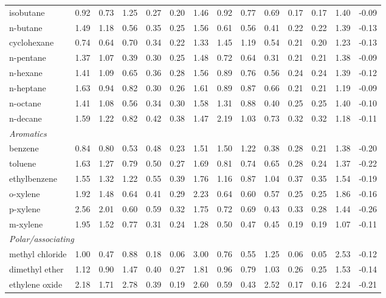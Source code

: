 \begin{table}[H]
\begin{tabular}{lccccccccccccc}
isobutane & 0.92 & 0.73 & 1.25 & 0.27 & 0.20 & 1.46 & 0.92 & 0.77 & 0.69 & 0.17 & 0.17 & 1.40 & -0.09 \\
n-butane & 1.49 & 1.18 & 0.56 & 0.35 & 0.25 & 1.56 & 0.61 & 0.56 & 0.41 & 0.22 & 0.22 & 1.39 & -0.13 \\
cyclohexane & 0.74 & 0.64 & 0.70 & 0.34 & 0.22 & 1.33 & 1.45 & 1.19 & 0.54 & 0.21 & 0.20 & 1.23 & -0.13 \\
n-pentane & 1.37 & 1.07 & 0.39 & 0.30 & 0.25 & 1.48 & 0.72 & 0.64 & 0.31 & 0.21 & 0.21 & 1.38 & -0.09 \\
n-hexane & 1.41 & 1.09 & 0.65 & 0.36 & 0.28 & 1.56 & 0.89 & 0.76 & 0.56 & 0.24 & 0.24 & 1.39 & -0.12 \\
n-heptane & 1.63 & 0.94 & 0.82 & 0.30 & 0.26 & 1.61 & 0.89 & 0.87 & 0.66 & 0.21 & 0.21 & 1.19 & -0.09 \\
n-octane & 1.41 & 1.08 & 0.56 & 0.34 & 0.30 & 1.58 & 1.31 & 0.88 & 0.40 & 0.25 & 0.25 & 1.40 & -0.10 \\
n-decane & 1.59 & 1.22 & 0.82 & 0.42 & 0.38 & 1.47 & 2.19 & 1.03 & 0.73 & 0.32 & 0.32 & 1.18 & -0.11 \\
\multicolumn{14}{l}{\emph{Aromatics}} \\
benzene & 0.84 & 0.80 & 0.53 & 0.48 & 0.23 & 1.51 & 1.50 & 1.22 & 0.38 & 0.28 & 0.21 & 1.38 & -0.20 \\
toluene & 1.63 & 1.27 & 0.79 & 0.50 & 0.27 & 1.69 & 0.81 & 0.74 & 0.65 & 0.28 & 0.24 & 1.37 & -0.22 \\
ethylbenzene & 1.55 & 1.32 & 1.22 & 0.55 & 0.39 & 1.76 & 1.16 & 0.87 & 1.04 & 0.37 & 0.35 & 1.54 & -0.19 \\
o-xylene & 1.92 & 1.48 & 0.64 & 0.41 & 0.29 & 2.23 & 0.64 & 0.60 & 0.57 & 0.25 & 0.25 & 1.86 & -0.16 \\
p-xylene & 2.56 & 2.01 & 0.60 & 0.59 & 0.32 & 1.75 & 0.72 & 0.69 & 0.43 & 0.33 & 0.28 & 1.44 & -0.26 \\
m-xylene & 1.95 & 1.52 & 0.77 & 0.31 & 0.24 & 1.28 & 0.50 & 0.47 & 0.45 & 0.19 & 0.19 & 1.07 & -0.11 \\
\multicolumn{14}{l}{\emph{Polar/associating}} \\
methyl chloride & 1.00 & 0.47 & 0.88 & 0.18 & 0.06 & 3.00 & 0.76 & 0.55 & 1.25 & 0.06 & 0.05 & 2.53 & -0.12 \\
dimethyl ether & 1.12 & 0.90 & 1.47 & 0.40 & 0.27 & 1.81 & 0.96 & 0.79 & 1.03 & 0.26 & 0.25 & 1.53 & -0.14 \\
ethylene oxide & 2.18 & 1.71 & 2.78 & 0.39 & 0.19 & 2.60 & 0.59 & 0.43 & 2.52 & 0.17 & 0.16 & 2.24 & -0.21 \\

\end{tabular}
\end{table}
